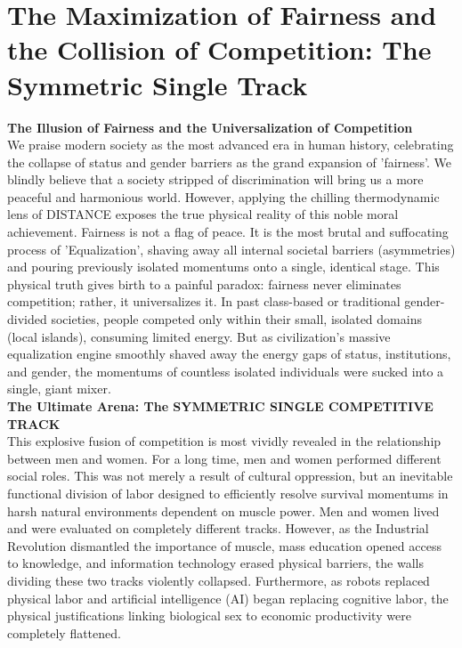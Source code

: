 

\section{The Maximization of Fairness and the Collision of Competition: The Symmetric Single Track}
\textbf{The Illusion of Fairness and the Universalization of Competition} \\
We praise modern society as the most advanced era in human history, celebrating the collapse of status and gender barriers as the grand expansion of 'fairness'. We blindly believe that a society stripped of discrimination will bring us a more peaceful and harmonious world.
However, applying the chilling thermodynamic lens of DISTANCE exposes the true physical reality of this noble moral achievement. Fairness is not a flag of peace. It is the most brutal and suffocating process of 'Equalization', shaving away all internal societal barriers (asymmetries) and pouring previously isolated momentums onto a single, identical stage.
This physical truth gives birth to a painful paradox: fairness never eliminates competition; rather, it universalizes it. In past class-based or traditional gender-divided societies, people competed only within their small, isolated domains (local islands), consuming limited energy. But as civilization's massive equalization engine smoothly shaved away the energy gaps of status, institutions, and gender, the momentums of countless isolated individuals were sucked into a single, giant mixer. \\
\textbf{The Ultimate Arena: The SYMMETRIC SINGLE COMPETITIVE TRACK} \\
This explosive fusion of competition is most vividly revealed in the relationship between men and women. For a long time, men and women performed different social roles. This was not merely a result of cultural oppression, but an inevitable functional division of labor designed to efficiently resolve survival momentums in harsh natural environments dependent on muscle power. Men and women lived and were evaluated on completely different tracks.
However, as the Industrial Revolution dismantled the importance of muscle, mass education opened access to knowledge, and information technology erased physical barriers, the walls dividing these two tracks violently collapsed. Furthermore, as robots replaced physical labor and artificial intelligence (AI) began replacing cognitive labor, the physical justifications linking biological sex to economic productivity were completely flattened.
